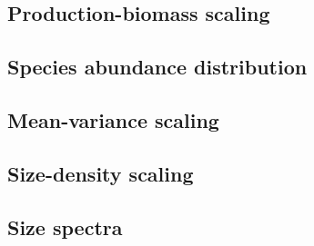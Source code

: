 \documentclass[12pt]{article}
\begin{document}
\subsection{Production-biomass scaling}
\subsection{Species abundance distribution}
\subsection{Mean-variance scaling}
\subsection{Size-density scaling}
\subsection{Size spectra}

\printbibliography
\end{document}
